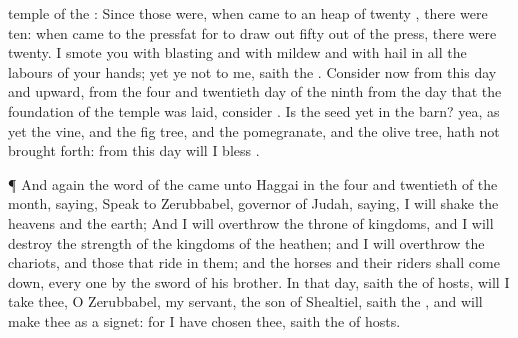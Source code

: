 {temple of the
{}:
Since those
{} were, when
{}
came to an
heap of
twenty
{}, there were
{}
ten: when
{}
came to the
pressfat for to draw
out
fifty
{} out of the
press, there were
{}
twenty.
I
smote you with
blasting and with
mildew and with
hail in all the
labours of your
hands; yet ye
{} not to me,
saith the
{}.
Consider now from this
day and
upward, from the
four and
twentieth
day of the
ninth
{} from the
day that the
foundation of the
{}
temple was laid,
consider
{}.
Is the
seed yet in the
barn? yea, as yet the
vine, and the fig
tree, and the
pomegranate, and the
olive
tree, hath not brought
forth: from this
day will I
bless
{}.
\par }{\PP {}¶ And
again the
word of the
{} came unto
Haggai in the
four and
twentieth
{} of the
month,
saying,
Speak to
Zerubbabel,
governor of
Judah,
saying, I will
shake the
heavens and the
earth;
And I will
overthrow the
throne of
kingdoms, and I will
destroy the
strength of the
kingdoms of the
heathen; and I will
overthrow the
chariots, and those that
ride in them; and the
horses and their
riders shall come
down, every
one by the
sword of his
brother.
In that
day,
saith the
{} of
hosts, will I
take thee, O
Zerubbabel, my
servant, the
son of
Shealtiel,
saith the
{}, and will
make thee as a
signet: for I have
chosen thee,
saith the
{} of
hosts.
\par }